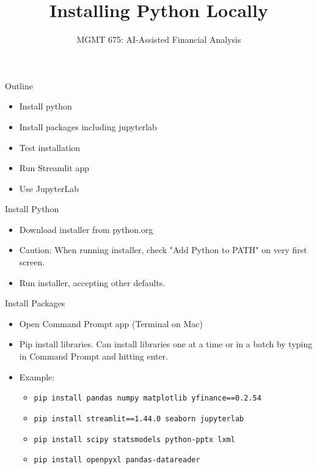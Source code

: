 \documentclass[10pt]{beamer}
\title{Installing Python Locally}
\subtitle{MGMT 675: AI-Assisted Financial Analysis}
\date{}
\begin{document}
\begin{frame}[plain]
\titlepage
\end{frame}

\begin{frame}{Outline}
\begin{itemize}
\item Install python
\item Install packages including jupyterlab
\item Test installation
\item Run Streamlit app
\item Use JupyterLab
\end{itemize}
\end{frame}

\begin{frame}{Install Python}
\begin{itemize}
    \item Download installer from python.org
    \item Caution: When running installer, check "Add Python to PATH" \alert{on very first screen}.
    \item Run installer, accepting other defaults.
\end{itemize}
\end{frame}

\begin{frame}{Install Packages}
\begin{itemize}
    \item Open Command Prompt app (Terminal on Mac)
    \item Pip install libraries.  Can install libraries one at a time or in a batch by typing in Command Prompt and hitting enter.
    \item Example: 
    \begin{itemize}
        \item \texttt{pip install pandas numpy matplotlib yfinance==0.2.54}
        \item \texttt{pip install streamlit==1.44.0 seaborn jupyterlab}
        \item \texttt{pip install scipy statsmodels python-pptx lxml}
        \item \texttt{pip install openpyxl pandas-datareader}
    \end{itemize}
\end{itemize}
\end{frame}
\end{document}
